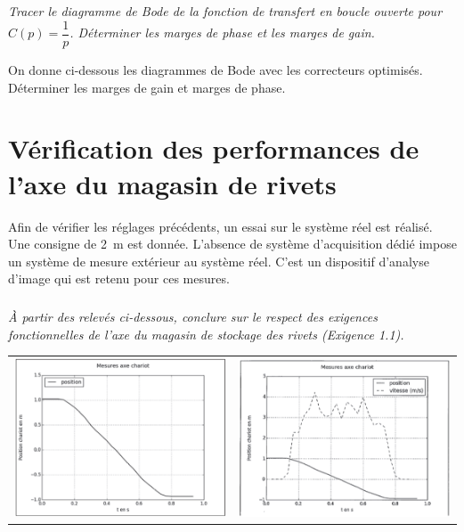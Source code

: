 \documentclass[10pt,fleqn]{article} %
\begin{document}
\begin{multicols}{2}
\subparagraph{}
\textit{Tracer le diagramme de Bode de la fonction de transfert en boucle ouverte pour $C(p)=\dfrac{1}{p}$. Déterminer les marges de phase et les marges de gain.}
\ifprof
\begin{corrige}
\end{corrige}
\else
\fi

\ifprof
\else

On donne ci-dessous les diagrammes de Bode avec les correcteurs optimisés. Déterminer les marges de gain et marges de phase. 
\fi

\section*{Vérification des performances de l'axe du magasin de rivets}
\ifprof
\else

Afin de vérifier les réglages précédents, un essai sur le système réel est réalisé. Une consigne de \SI{2}{m} est donnée. L'absence de système d'acquisition dédié impose un système de mesure extérieur au système réel. C'est un dispositif d'analyse d'image qui est retenu pour ces mesures.
\fi

\subparagraph{}
\textit{À partir des relevés ci-dessous, conclure sur le respect des exigences fonctionnelles de l'axe du magasin de stockage des rivets (Exigence 1.1).}
\ifprof
\begin{corrige}
\end{corrige}
\else
\fi
 
\end{multicols}

\ifprof
\else

\begin{center}
\begin{tabular}{cc}
\includegraphics[width=7cm]{images/image13} &
\includegraphics[width=7cm]{images/image14}

\end{tabular}
\end{center}
\end{document}
